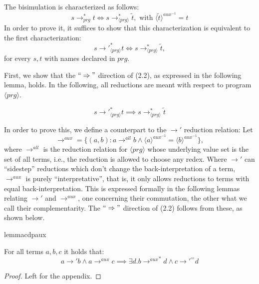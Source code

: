The bisimulation is characterized as follows:
\[
s {\longrightarrow}_{prg}^* t \iff s \longrightarrow^*_{\langle prg \rangle} \widetilde{t}, \text{ with } \langle \widetilde{t} \rangle^{aux^{-1}} = t
\]
In order to prove it, it suffices to show that this characterization is equivalent to the first characterization:
\begin{equation}
s {\longrightarrow'}_{\langle prg \rangle}^* t \iff s \longrightarrow^*_{\langle prg \rangle} \widetilde{t},
\end{equation}
for every $s, t$ with names declared in $prg$.

First, we show that the $`` \Rightarrow "$ direction of (2.2), as expressed in the following lemma, holds. In the following, all reductions are meant with respect to program $\langle prg \rangle$.

\begin{lemma}
\label{lem:prop2lr}
\[
s {\longrightarrow'}_{\langle prg \rangle}^* t \implies s \longrightarrow^*_{\langle prg \rangle} \widetilde{t}
\]
\end{lemma}

In order to prove this, we define a counterpart to the $\longrightarrow'$ reduction relation: Let
\[
\longrightarrow^{aux} = \{(a,b) : a \longrightarrow^{all} b \land \langle a \rangle^{aux^{-1}} = \langle b \rangle^{aux^{-1}}\},
\]
where $\longrightarrow^{all}$ is the reduction relation for $\langle prg \rangle$ whose underlying value set is the set of all terms, i.e., the reduction is allowed to choose any redex. Where $\longrightarrow'$ can ``sidestep'' reductions which don't change the back-interpretation of a term, $\longrightarrow^{aux}$ is purely ``interpretative'', that is, it only allows reductions to terms with equal back-interpretation. This is expressed formally in the following lemmas relating $\longrightarrow'$ and $\longrightarrow^{aux}$, one concerning their commutation, the other what we call their complementarity. The $`` \Rightarrow "$ direction of (2.2) follows from these, as shown below.

\begin{restatable}[Commutation]{lemma}{cdpaux}
\label{lem:cdpaux}

For all terms $a,b,c$ it holds that:
\[
a {\longrightarrow'} b \land a \longrightarrow^{aux} c \implies \exists d . b {\longrightarrow^{aux}}^* d \land c {\longrightarrow'}^= d
\]

\end{restatable}
\begin{proof}
Left for the appendix.
\end{proof}

